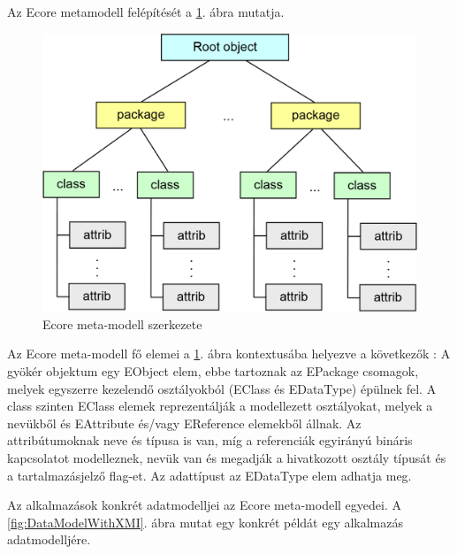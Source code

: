 Az Ecore metamodell felépítését a \ref{fig:EcoreStruct}. ábra mutatja.

\begin{figure}[h]
\centering
\includegraphics[width=\textwidth]{figures/ecore-metamodel-struct.png}
\caption{Ecore meta-modell szerkezete}
\label{fig:EcoreStruct}
\end{figure}

Az Ecore meta-modell fő elemei a \ref{fig:EcoreStruct}. ábra kontextusába helyezve a következők \cite{EMFFundamentals}: 
A gyökér objektum egy EObject elem, ebbe tartoznak az EPackage csomagok, melyek egyszerre kezelendő osztályokból (EClass és EDataType) épülnek fel. A class szinten EClass elemek reprezentálják a modellezett osztályokat, melyek a nevükből és EAttribute és/vagy EReference elemekből állnak. Az attribútumoknak neve és típusa is van, míg a referenciák egyirányú bináris kapcsolatot modelleznek, nevük van és megadják a hivatkozott osztály típusát és a tartalmazásjelző flag-et. Az adattípust az EDataType elem adhatja meg.  

Az alkalmazások konkrét adatmodelljei az Ecore meta-modell egyedei. A \ref{fig:DataModelWithXMI}. ábra mutat egy konkrét példát egy alkalmazás adatmodelljére.


